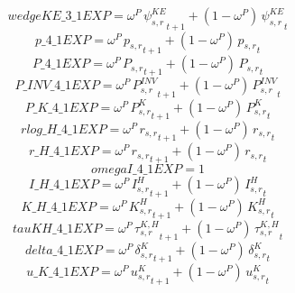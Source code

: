 \begin{dmath*}
wedgeKE\_3\_1EXP = {{\omega^{P}}}\, {{\psi^{KE}_{s,r}}}_{t+1}+\left(1-{{\omega^{P}}}\right)\, {{\psi^{KE}_{s,r}}}_{t}
\end{dmath*}
\begin{dmath*}
p\_4\_1EXP = {{\omega^{P}}}\, {{p_{s,r}}}_{t+1}+\left(1-{{\omega^{P}}}\right)\, {{p_{s,r}}}_{t}
\end{dmath*}
\begin{dmath*}
P\_4\_1EXP = {{\omega^{P}}}\, {{P_{s,r}}}_{t+1}+\left(1-{{\omega^{P}}}\right)\, {{P_{s,r}}}_{t}
\end{dmath*}
\begin{dmath*}
P\_INV\_4\_1EXP = {{\omega^{P}}}\, {{P^{INV}_{s,r}}}_{t+1}+\left(1-{{\omega^{P}}}\right)\, {{P^{INV}_{s,r}}}_{t}
\end{dmath*}
\begin{dmath*}
P\_K\_4\_1EXP = {{\omega^{P}}}\, {{P^K_{s,r}}}_{t+1}+\left(1-{{\omega^{P}}}\right)\, {{P^K_{s,r}}}_{t}
\end{dmath*}
\begin{dmath*}
rlog\_H\_4\_1EXP = {{\omega^{P}}}\, {{r_{s,r}}}_{t+1}+\left(1-{{\omega^{P}}}\right)\, {{r_{s,r}}}_{t}
\end{dmath*}
\begin{dmath*}
r\_H\_4\_1EXP = {{\omega^{P}}}\, {{r_{s,r}}}_{t+1}+\left(1-{{\omega^{P}}}\right)\, {{r_{s,r}}}_{t}
\end{dmath*}
\begin{dmath*}
omegaI\_4\_1EXP = 1
\end{dmath*}
\begin{dmath*}
I\_H\_4\_1EXP = {{\omega^{P}}}\, {{I^H_{s,r}}}_{t+1}+\left(1-{{\omega^{P}}}\right)\, {{I^H_{s,r}}}_{t}
\end{dmath*}
\begin{dmath*}
K\_H\_4\_1EXP = {{\omega^{P}}}\, {{K^H_{s,r}}}_{t+1}+\left(1-{{\omega^{P}}}\right)\, {{K^H_{s,r}}}_{t}
\end{dmath*}
\begin{dmath*}
tauKH\_4\_1EXP = {{\omega^{P}}}\, {{\tau^{K,H}_{s,r}}}_{t+1}+\left(1-{{\omega^{P}}}\right)\, {{\tau^{K,H}_{s,r}}}_{t}
\end{dmath*}
\begin{dmath*}
delta\_4\_1EXP = {{\omega^{P}}}\, {{\delta^{K}_{s,r}}}_{t+1}+\left(1-{{\omega^{P}}}\right)\, {{\delta^{K}_{s,r}}}_{t}
\end{dmath*}
\begin{dmath*}
u\_K\_4\_1EXP = {{\omega^{P}}}\, {{u^K_{s,r}}}_{t+1}+\left(1-{{\omega^{P}}}\right)\, {{u^K_{s,r}}}_{t}
\end{dmath*}
